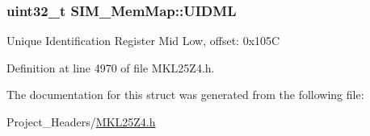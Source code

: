 \subsubsection[{\texorpdfstring{U\+I\+D\+ML}{UIDML}}]{\setlength{\rightskip}{0pt plus 5cm}uint32\+\_\+t S\+I\+M\+\_\+\+Mem\+Map\+::\+U\+I\+D\+ML}\hypertarget{struct_s_i_m___mem_map_a51e871d8ac13db8b605b6ec1b3292be4}{}\label{struct_s_i_m___mem_map_a51e871d8ac13db8b605b6ec1b3292be4}
Unique Identification Register Mid Low, offset\+: 0x105C 

Definition at line 4970 of file M\+K\+L25\+Z4.\+h.



The documentation for this struct was generated from the following file\+:\begin{DoxyCompactItemize}
\item 
Project\+\_\+\+Headers/\hyperlink{_m_k_l25_z4_8h}{M\+K\+L25\+Z4.\+h}\end{DoxyCompactItemize}
